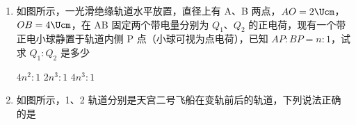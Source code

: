 \documentclass[\gkver]{gaokaozhenti}
\begin{document}
\begin{enumerate}
{	$\varphi_{\text{上}} = \frac{E}{5R}\cdot 2R = \frac{2E}{5}$

	电容器下极板的电势为

	$\varphi_{\text{下}} = \frac{E}{5R}\cdot 4R = \frac{4E}{5}$

	则电容两端的电压

	$U_{\text{下上}} = \frac{2E}{5}$

	则电容器上的电荷量为

	$Q = CU_{\text{上下}} = \frac{2}{5} CE$

	故选 C。
}

\item
如图所示，一光滑绝缘轨道水平放置，直径上有 A、B 两点，$AO = 2 \Ucm$，$OB = 4 \Ucm$，在 AB 固定两个带电量分别为 $Q_{1}$、$Q_{2}$ 的正电荷，现有一个带正电小球静置于轨道内侧 P 点（小球可视为点电荷），已知 $AP:BP = n:1$，试求 $Q_{1}:Q_{2}$ 是多少


{$4n^{2}:1$}
{$2n^{3}:1$}
{$4n^{3}:1$}


\item
如图所示，1、2 轨道分别是天宫二号飞船在变轨前后的轨道，下列说法正确的是


\end{enumerate}
\end{document}
